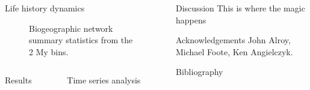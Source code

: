 \documentclass[final]{beamer}\usepackage[]{graphicx}\usepackage[]{color}
\newlength{\onecolwid}
\newlength{\twocolwid}
\begin{document}
\begin{frame}[t]
\begin{columns}[t]
\begin{column}{\twocolwid}
\begin{alertblock}{Life history dynamics}
\begin{figure}[ht]
\begin{center}
\begin{subfigure}[b]{\onecolwid}
              \label{fig:net_loco}
            \end{subfigure}
          \end{center}
          \caption{Biogeographic network summary statistics from the 2 My bins.}
          \label{fig:net_sum}
        \end{figure}
      \end{alertblock}

      \begin{columns}[t,totalwidth = \twocolwid]
        \begin{column}{\onecolwid}
          \begin{block}{Results}

          \end{block}
        \end{column}

        \begin{column}{\onecolwid}
          \begin{block}{Time series analysis}
           
          \end{block}
        \end{column}
      \end{columns}


    \end{column}

    \begin{columns}[t,totalwidth = \onecolwid]
      \begin{column}{\onecolwid}
        \begin{block}{Discussion}
          This is where the magic happens
        \end{block}

        \begin{block}{Acknowledgements}
          John Alroy, Michael Foote, Ken Angielczyk.
        \end{block}

        \begin{scriptsize}
          \begin{block}{Bibliography}
            
            
          \end{block}
        \end{scriptsize}
      \end{column}
    \end{columns}

  \end{columns}
\end{frame}
\end{document}
